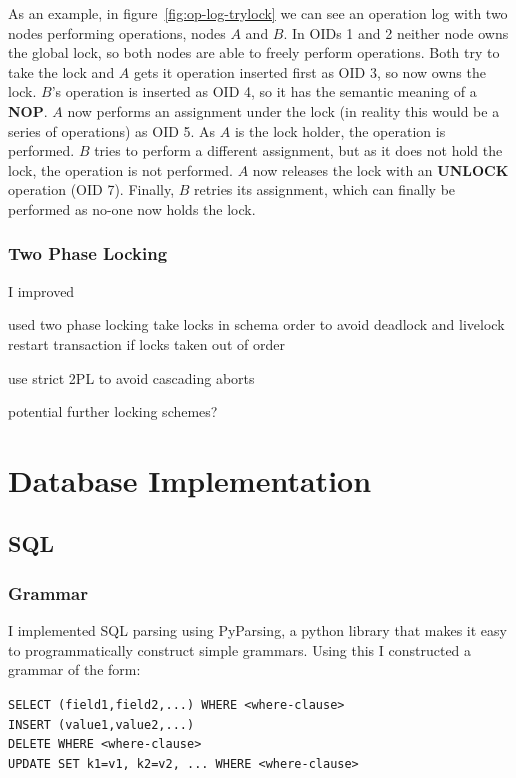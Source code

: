 \documentclass[12pt,twoside,notitlepage]{report}
\newcommand{\op}[1]  {{\bf #1}}         %
\begin{document}
As an example, in figure~\ref{fig:op-log-trylock} we can see an operation log with two nodes
performing operations, nodes $A$ and $B$. In OIDs 1 and 2 neither node owns the global lock, so both
nodes are able to freely perform operations. Both try to take the lock and $A$ gets it operation
inserted first as OID 3, so now owns the lock. $B$'s operation is inserted as OID 4, so it has the
semantic meaning of a \op{NOP}. $A$ now performs an assignment under the lock (in reality this
would be a series of operations) as OID 5. As $A$ is the lock holder, the operation is performed.
$B$ tries to perform a different assignment, but as it does not hold the lock, the operation is
not performed. $A$ now releases the lock with an \op{UNLOCK} operation (OID 7). Finally, $B$
retries its assignment, which can finally be performed as no-one now holds the lock.

\subsubsection{Two Phase Locking}

I improved 

used two phase locking
take locks in schema order to avoid deadlock and livelock
restart transaction if locks taken out of order

use strict 2PL to avoid cascading aborts

potential further locking schemes?

\section{Database Implementation}

\subsection{SQL}

\subsubsection{Grammar}

I implemented SQL parsing using PyParsing, a python library that makes it easy to programmatically
construct simple grammars. Using this I constructed a grammar of the form:

\verb+SELECT (field1,field2,...) WHERE <where-clause>+ \\
\verb+INSERT (value1,value2,...)+ \\
\verb+DELETE WHERE <where-clause>+ \\
\verb+UPDATE SET k1=v1, k2=v2, ... WHERE <where-clause>+ \\
\end{document}
